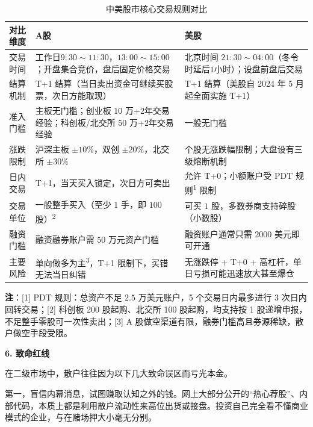 \documentclass[12pt,openany]{book}
\newcommand{\subhead}[1]{%
    \par\vspace{0.5\baselineskip}%
    \noindent\textbf{#1}\par%
    \vspace{0.5\baselineskip}%
}
\begin{document}
\begin{table}[tbp]
  \centering
  \small
  \singlespacing
  \renewcommand{\arraystretch}{0.92}
  \caption{中美股市核心交易规则对比}
  \label{tab:cn_us_stock_rules}
  \begin{tabularx}{\textwidth}{|>{\centering\arraybackslash\hsize=0.55\hsize}X|>{\centering\arraybackslash\hsize=1.2\hsize}X|>{\centering\arraybackslash\hsize=1.25\hsize}X|}
    \hline
    对比维度 & A股 & 美股 \\ \hline
    交易时间 & 工作日$9{:}30\sim 11{:}30$，$13{:}00\sim 15{:}00$；开盘集合竞价，盘后固定价格交易 & 北京时间 $21{:}30\sim 04{:}00$（冬令时延后$1$小时）；设盘前盘后交易 \\ \hline
    结算机制 & T+1 结算（当日卖出资金可继续买股票，次日方能取现） & T+1 结算（美股自 2024 年 5 月起全面实施 T+1） \\ \hline
    准入门槛 & 主板无门槛；创业板 $10$ 万+$2$年交易经验；科创板/北交所 $50$ 万+$2$年交易经验 & 一般无门槛 \\ \hline
    涨跌限制 & 沪深主板 $\pm10\%$，双创 $\pm20\%$，北交所 $\pm30\%$ & 个股无涨跌幅限制；大盘设有三级熔断机制 \\ \hline
    日内交易 & T+1，当天买入锁定，次日方可卖出 & 允许 T+0；小额账户受 PDT 规则\textsuperscript{1} 限制 \\ \hline
    交易单位 & 一般整手买入（至少 $1$ 手，即 $100$ 股）\textsuperscript{2} & 可买 $1$ 股，多数券商支持碎股（小数股） \\ \hline
    融资门槛 & 融资融券账户需 $50$ 万元资产门槛 & 融资账户通常只需 $2000$ 美元即可开通 \\ \hline
    主要风险 & 单向做多为主\textsuperscript{3}，T+1 限制下，买错无法当日纠错 & 无涨跌停 + T+0 + 高杠杆，单日亏损可能迅速放大甚至爆仓 \\ \hline
  \end{tabularx}
  \par\vspace{3pt}
  {\footnotesize\singlespacing\noindent\raggedright
  \textbf{注}：[1] PDT 规则：总资产不足 $2.5$ 万美元账户，5 个交易日内最多进行 3 次日内回转交易；[2] 科创板 200 股起购、北交所 100 股起购，均支持按 1 股递增申报，不足整手零股可一次性卖出；[3] A 股做空渠道有限，融券门槛高且券源稀缺，散户做空手段受限。\par}
\end{table}

\subhead{6. 致命红线}

在二级市场中，散户往往因为以下几大致命误区而亏光本金。

第一，盲信内幕消息，试图赚取认知之外的钱。网上大部分公开的“热心荐股”、内部代码，本质上都是利用散户流动性来高位出货或接盘。投资自己完全看不懂商业模式的企业，与在赌场押大小毫无分别。
\end{document}
